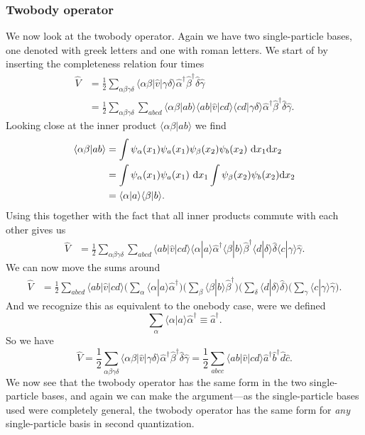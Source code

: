 \documentclass[a4paper, 11pt, notitlepage, english]{article}
\newcommand{\braket}[2]{\langle #1 | #2 \rangle}
\newcommand{\op}[1]{\hat{#1}}
\newcommand{\braopket}[3]{\langle #1 | {#2} | #3 \rangle}
\renewcommand{\d}{{\rm d}}
\begin{document}
\clearpage

\subsubsection*{Twobody operator}
We now look at the twobody operator. Again we have two single-particle bases, one denoted with greek letters and one with roman letters. We start of by inserting the completeness relation four times
\begin{align*}
\op{V} &= \frac{1}{2}\sum_{\alpha\beta\gamma\delta} \braopket{\alpha\beta}{\op{v}}{\gamma\delta} \op{\alpha}^\dag \op{\beta}^\dag \op{\delta} \op{\gamma} \\
&= \frac{1}{2}\sum_{\alpha\beta\gamma\delta} \sum_{abcd}\braket{\alpha\beta}{ab}\braopket{ab}{\op{v}}{cd}\braket{cd}{\gamma\delta} \op{\alpha}^\dag \op{\beta}^\dag \op{\delta} \op{\gamma}.
\end{align*}
Looking close at the inner product $\braket{\alpha\beta}{ab}$ we find
\begin{align*}
\braket{\alpha \beta}{ab} &= \int \psi_{\alpha}(x_1)\psi_a(x_1)\psi_{\beta}(x_2)\psi_b(x_2) \ \d x_1 \d x_2 \\
&= \int \psi_{\alpha}(x_1)\psi_a(x_1) \ \d x_1 \int \psi_{\beta}(x_2)\psi_b(x_2) \d x_2 \\
&= \braket{\alpha}{a}\braket{\beta}{b}.
\end{align*}
Using this together with the fact that all inner products commute with each other gives us
\begin{align*}
\op{V} &= \frac{1}{2}\sum_{\alpha\beta\gamma\delta} \sum_{abcd} \braopket{ab}{\op{v}}{cd} \braket{\alpha}{a} \op{\alpha}^\dag \braket{\beta}{b}\op{\beta}^\dag \braket{d}{\delta}\op{\delta} \braket{c}{\gamma} \op{\gamma}.
\end{align*}
We can now move the sums around
\begin{align*}
\op{V} &= \frac{1}{2} \sum_{abcd} \braopket{ab}{\op{v}}{cd} \bigg(\sum_{\alpha}\braket{\alpha}{a} \op{\alpha}^\dag \bigg)\bigg(\sum_{\beta}\braket{\beta}{b}\op{\beta}^\dag \bigg)\bigg(\sum_{\delta}\braket{d}{\delta}\op{\delta} \bigg)\bigg(\sum_{\gamma}\braket{c}{\gamma} \op{\gamma}\bigg).
\end{align*}
And we recognize this as equivalent to the onebody case, were we defined
$$\sum_\alpha \braket{\alpha}{a}\op{\alpha}^\dag \equiv \op{a}^\dag.$$
So we have
$$\op{V} = \frac{1}{2}\sum_{\alpha\beta\gamma\delta}\braopket{\alpha\beta}{\op{v}}{\gamma\delta}\op{\alpha}^\dag \op{\beta}^\dag \op{\delta} \op{\gamma} = \frac{1}{2}\sum_{abcc}\braopket{ab}{\op{v}}{cd}\op{a}^\dag \op{b}^\dag \op{d} \op{c}.$$
We now see that the twobody operator has the same form in the two single-particle bases, and again we can make the argument---as the single-particle bases used were completely general, the twobody operator has the same form for \emph{any} single-particle basis in second quantization.
\end{document}
